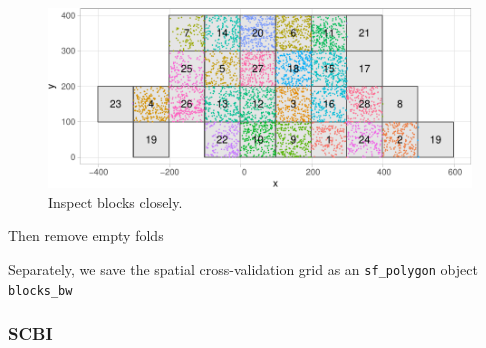 \documentclass[12pt]{article}
\newenvironment{Shaded}{\begin{snugshade}}{\end{snugshade}}
\newcommand{\DataTypeTok}[1]{\textcolor[rgb]{0.13,0.29,0.53}{#1}}
\newcommand{\DecValTok}[1]{\textcolor[rgb]{0.00,0.00,0.81}{#1}}
\newcommand{\KeywordTok}[1]{\textcolor[rgb]{0.13,0.29,0.53}{\textbf{#1}}}
\newcommand{\NormalTok}[1]{#1}
\newcommand{\OperatorTok}[1]{\textcolor[rgb]{0.81,0.36,0.00}{\textbf{#1}}}
\newcommand{\StringTok}[1]{\textcolor[rgb]{0.31,0.60,0.02}{#1}}
\begin{document}
\begin{figure}

{\centering \includegraphics[width=1\linewidth]{Figures/bw-define-cv-folds-with-trees-1} 

}

\caption{Inspect blocks closely.}\label{fig:bw-define-cv-folds-with-trees}
\end{figure}

Then remove empty folds

\begin{Shaded}
\end{Shaded}

Separately, we save the spatial cross-validation grid as an
\texttt{sf\_polygon} object \texttt{blocks\_bw}

\begin{Shaded}
\end{Shaded}

\hypertarget{scbi-1}{%
\subsubsection{SCBI}\label{scbi-1}}
\end{document}
